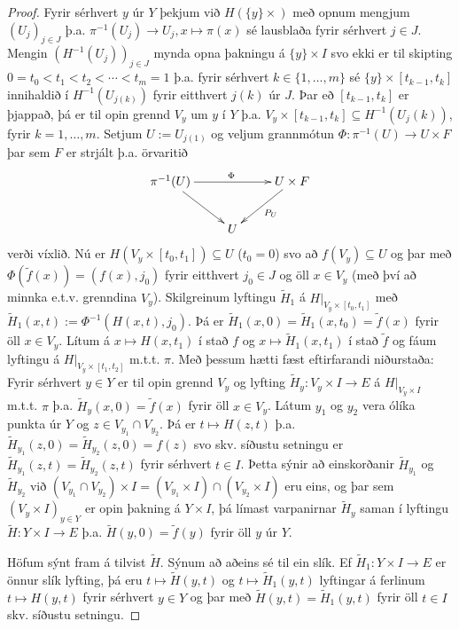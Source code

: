 \documentclass[a4paper,icelandic]{book}
\theoremstyle{definition}
\theoremstyle{plain}
\theoremstyle{remark}
\begin{document}
\begin{proof}
  Fyrir sérhvert $y$ úr $Y$ þekjum við $H(\{y\}\times)$ með opnum
  mengjum $(U_j)_{j\in J}$ þ.a. $\pi^{-1}(U_j)\to U_j, x\mapsto\pi(x)$
  sé lausblaða fyrir sérhvert $j\in J$.  Mengin
  $(H^{-1}(U_j))_{j\in J}$ mynda opna þakningu á $\{y\}\times I$ svo
  ekki er til skipting $0=t_0<t_1<t_2<\cdots<t_m=1$ þ.a. fyrir sérhvert
  $k\in\{1,\dots,m\}$ sé $\{y\}\times[t_{k-1},t_k]$ innihaldið í
  $H^{-1}(U_{j(k)})$ fyrir eitthvert $j(k)$ úr $J$. Þar eð
  $[t_{k-1},t_k]$ er þjappað, þá er til opin grennd $V_y$ um $y$ í $Y$
  þ.a. $V_y\times[t_{k-1},t_k]\subseteq H^{-1}(U_j(k))$, fyrir
  $k=1,\dots,m$. Setjum $U:=U_{j(1)}$ og veljum grannmótun
  $\Phi:\pi^{-1}(U)\to U\times F$ þar sem $F$ er strjált þ.a. örvaritið 
  \[\xymatrix{
  \pi^{-1}(U)\ar[rr]^{\Phi}\ar[dr]
  && U\times F\ar[dl]^{P_U} \\
  & U &
  }\]
  verði víxlið. Nú er $H(V_y\times[t_0,t_1])\subseteq U$ ($t_0=0$) svo
  að $f(V_y)\subseteq U$ og þar með $\Phi(\tilde f(x)) = (f(x),j_0)$
  fyrir eitthvert $j_0\in J$ og öll $x\in V_y$ (með því að minnka e.t.v.
  grenndina $V_y$). Skilgreinum lyftingu $\tilde H_1$ á
  $H|_{V_y\times[t_0,t_1]}$ með $\tilde H_1(x,t) :=
  \Phi^{-1}(H(x,t),j_0)$. Þá er $\tilde H_1(x,0) = \tilde H_1(x,t_0) =
  \tilde f(x)$ fyrir öll $x\in V_y$. Lítum á $x\mapsto H(x,t_1)$ í stað
  $f$ og $x\mapsto \tilde H_1(x,t_1)$ í stað $\tilde f$ og fáum
  lyftingu á $H|_{V_y\times[t_1,t_2]}$ m.t.t. $\pi$. Með þessum hætti
  fæst eftirfarandi niðurstaða: Fyrir sérhvert $y\in Y$ er til opin
  grennd $V_y$ og lyfting $\tilde H_y: V_y\times I\to E$ á
  $H|_{V_y\times I}$ m.t.t. $\pi$ þ.a. $\tilde H_y(x,0)=\tilde f(x)$
  fyrir öll $x\in V_y$. Látum $y_1$ og $y_2$ vera ólíka punkta úr $Y$ og
  $z\in V_{y_1}\cap V_{y_2}$. Þá er $t\mapsto H(z,t)$ þ.a. $\tilde
  H_{y_1}(z,0) = \tilde H_{y_2}(z,0) = f(z)$ svo skv. síðustu setningu
  er $\tilde H_{y_1}(z,t) = \tilde H_{y_2}(z,t)$ fyrir sérhvert $t\in
  I$. Þetta sýnir að einskorðanir $\tilde H_{y_1}$ og $\tilde
  H_{y_2}$ við $(V_{y_1}\cap V_{y_2})\times I = (V_{y_1}\times
  I)\cap(V_{y_2}\times I)$ eru eins, og þar sem $(V_y\times
  I)_{y\in Y}$ er opin þakning á $Y\times I$, þá límast varpanirnar
  $\tilde H_y$ saman í lyftingu $\tilde H:Y\times I\to E$ þ.a.
  $\tilde H(y,0) = \tilde f(y)$ fyrir öll $y$ úr $Y$.

  Höfum sýnt fram á tilvist $\tilde H$. Sýnum að aðeins sé til ein slík.
  Ef $\tilde H_1:Y\times I\to E$ er önnur slík lyfting, þá eru $t\mapsto
  \tilde H(y,t)$ og $t\mapsto \tilde H_1(y,t)$ lyftingar á ferlinum
  $t\mapsto H(y,t)$ fyrir sérhvert $y\in Y$ og þar með $\tilde H(y,t) =
  \tilde H_1(y,t)$ fyrir öll $t\in I$ skv. síðustu setningu.
\end{proof}
\end{document}
